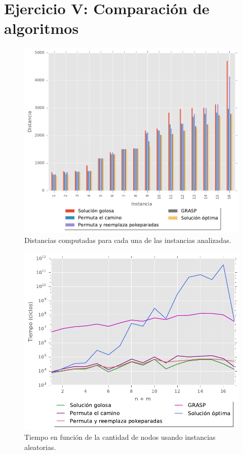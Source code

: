 \section{Ejercicio V: Comparaci\'on de algoritmos}

\begin{figure}[H]
  \begin{center}
    \includegraphics{../experimentacion/ej5/expAleatOp_instancia_distancia.pdf}
    \caption{Distancias computadas para cada una de las instancias analizadas.}
    \label{fig:ej5_expAleatOp_instancia_distancia}
  \end{center}
\end{figure}

\begin{figure}[H]
  \begin{center}
    \includegraphics{../experimentacion/ej5/expAleatOp_cantNodos_tiempo.pdf}
    \caption{Tiempo en funci\'on de la cantidad de nodos usando instancias aleatorias.}
    \label{fig:ej5_expAleatOp_cantNodos_tiempo}
  \end{center}
\end{figure}

